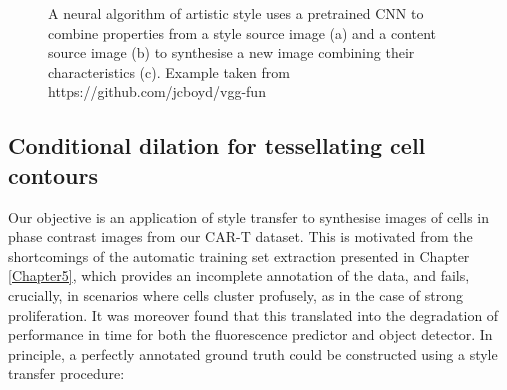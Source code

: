 \begin{figure}%
    \centering
    \qquad
    \qquad
    \caption{A neural algorithm of artistic style uses a pretrained CNN to combine properties from a style source image (a) and a content source image (b) to synthesise a new image combining their characteristics (c). Example taken from https://github.com/jcboyd/vgg-fun}%
    \label{fig:style_transfer}%
\end{figure}

\subsection{Conditional dilation for tessellating cell contours}
\label{subsec:conditional_dilation}

Our objective is an application of style transfer to synthesise images of cells in phase contrast images from our CAR-T dataset. This is motivated from the shortcomings of the automatic training set extraction presented in Chapter \ref{Chapter5}, which provides an incomplete annotation of the data, and fails, crucially, in scenarios where cells cluster profusely, as in the case of strong proliferation. It was moreover found that this translated into the degradation of performance in time for both the fluorescence predictor and object detector. In principle, a perfectly annotated ground truth could be constructed using a style transfer procedure:

